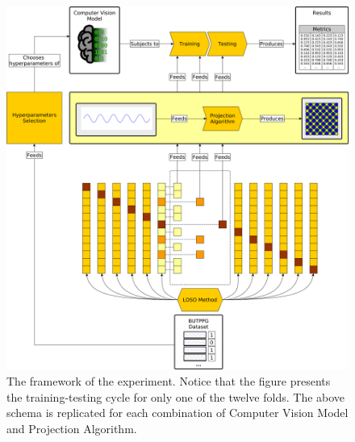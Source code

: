 \begin{figure}
	\includegraphics[width=\textwidth]{img/framework.png}
	\caption{The framework of the experiment. Notice that the figure presents the training-testing cycle for only one of the twelve folds. The above schema is replicated for each combination of  Computer Vision Model and Projection Algorithm.}
	\label{fig:framework}
\end{figure}
